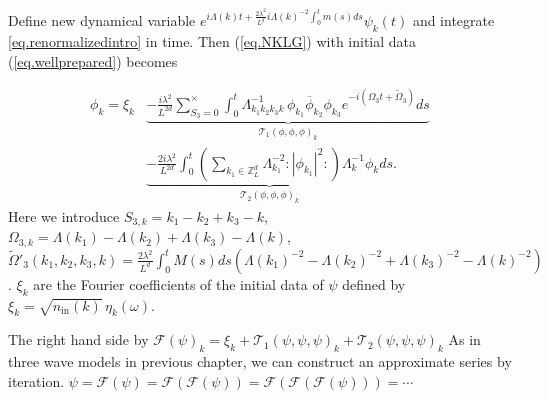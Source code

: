 

Define new dynamical variable $e^{i\Lambda(k) t+\frac{2\lambda^2}{L^{d}} i \Lambda(k)^{-2}\int^t_{0}m(s) ds}  \psi_k(t)$ and integrate \eqref{eq.renormalizedintro} in time. Then  (\ref{eq.NKLG}) with initial data (\ref{eq.wellprepared}) becomes

\begin{equation}\label{eq.intmainintro}
    \begin{split}
        \phi_k =\xi_k
        &\underbrace{-  \frac{i\lambda^2}{L^{2d}} \sum\limits^{\times}_{S_3=0} \int^{t}_0  \Lambda_{k_1k_2k_3k}^{-1}\,\phi_{k_1}\overline{\phi}_{k_2}  \phi_{k_3}e^{- i (\Omega_3t+\widetilde{\Omega}_3)} ds}_{\mathcal{T}_1(\phi,\phi,\phi)_k}
        \\
        &\underbrace{-  \frac{2i\lambda^2}{L^{2d}}  \int^{t}_0 \left(\sum\limits_{k_1\in \mathbb{Z}^d_L} \Lambda_{k_1}^{-2}:|\phi_{k_1}|^2: \right) \Lambda_{k}^{-1}\phi_{k} ds}_{\mathcal{T}_2(\phi,\phi,\phi)_k}.
    \end{split}
    \end{equation}
Here we introduce $S_{3,k}=k_1-k_2+k_3-k$, $\Omega_{3,k}=\Lambda(k_1)-\Lambda(k_2)+\Lambda(k_3)-\Lambda(k)$, $\widetilde{\Omega}'_3(k_1,k_2,k_3,k)=\frac{2\lambda^2}{L^{d}} \int^t_{0}M(s) ds\left(\Lambda(k_1)^{-2}-\Lambda(k_2)^{-2}+\Lambda(k_3)^{-2}-\Lambda(k)^{-2}\right)$. $\xi_k$ are the Fourier coefficients of the initial data of $\psi$ defined by $\xi_k=\sqrt{n_{\textrm{in}}(k)} \, \eta_{k}(\omega)$.

The right hand side by $\mathcal{F}(\psi)_k=\xi_k+\mathcal{T}_1(\psi,\psi,\psi)_k + \mathcal{T}_2(\psi,\psi,\psi)_k$ As in three wave models in previous chapter, we can construct an approximate series by iteration. $\psi=\mathcal{F}(\psi)=\mathcal{F}(\mathcal{F}(\psi))=\mathcal{F}(\mathcal{F}(\mathcal{F}(\psi)))=\cdots$

